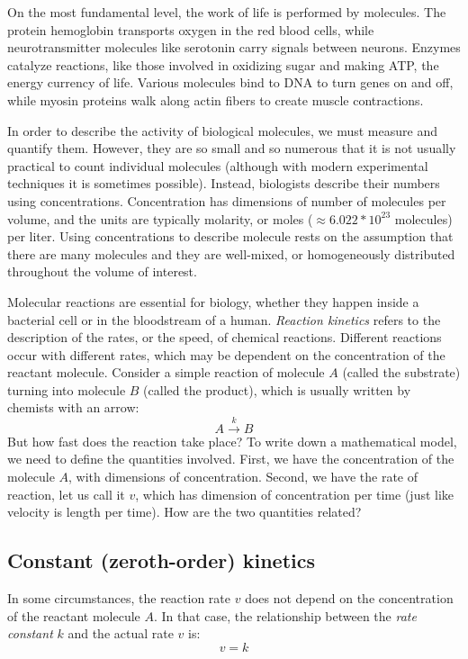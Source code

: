 \documentclass[
]{book}
\theoremstyle{definition}
\theoremstyle{definition}
\theoremstyle{definition}
\theoremstyle{remark}
\begin{document}
On the most fundamental level, the work of life is performed by molecules. The protein hemoglobin transports oxygen in the red blood cells, while neurotransmitter molecules like serotonin carry signals between neurons. Enzymes catalyze reactions, like those involved in oxidizing sugar and making ATP, the energy currency of life. Various molecules bind to DNA to turn genes on and off, while myosin proteins walk along actin fibers to create muscle contractions.

In order to describe the activity of biological molecules, we must measure and quantify them. However, they are so small and so numerous that it is not usually practical to count individual molecules (although with modern experimental techniques it is sometimes possible). Instead, biologists describe their numbers using concentrations. Concentration has dimensions of number of molecules per volume, and the units are typically molarity, or moles (\(\approx 6.022*10^{23}\) molecules) per liter. Using concentrations to describe molecule rests on the assumption that there are many molecules and they are well-mixed, or homogeneously distributed throughout the volume of interest.

Molecular reactions are essential for biology, whether they happen inside a bacterial cell or in the bloodstream of a human. \emph{Reaction kinetics}  refers to the description of the rates, or the speed, of chemical reactions. Different reactions occur with different rates, which may be dependent on the concentration of the reactant molecule. Consider a simple reaction of molecule \(A\) (called the substrate) turning into molecule \(B\) (called the product), which is usually written by chemists with an arrow:
\[
  A \xrightarrow{k} B
\]
But how fast does the reaction take place? To write down a mathematical model, we need to define the quantities involved. First, we have the concentration of the molecule \(A\), with dimensions of concentration. Second, we have the rate of reaction, let us call it \(v\), which has dimension of concentration per time (just like velocity is length per time). How are the two quantities related?

\hypertarget{constant-zeroth-order-kinetics}{%
\subsection{Constant (zeroth-order) kinetics}\label{constant-zeroth-order-kinetics}}

 In some circumstances, the reaction rate \(v\) does not depend on the concentration of the reactant molecule \(A\). In that case, the relationship between the  \emph{rate constant} \(k\) and the actual rate \(v\) is:
\begin{equation}
v = k
\label{eq:kinetics_0th_order}
\end{equation}
\end{document}

